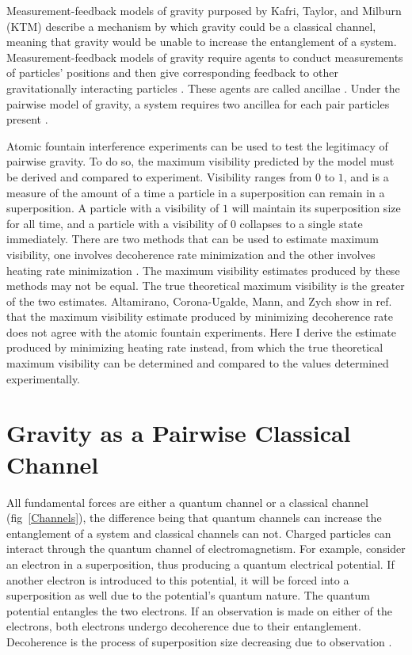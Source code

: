 \documentclass[aps, prd, superscriptaddress,twocolumn,amsmath,amssymb,nofootinbib]{revtex4-1}
\begin{document}
Measurement-feedback models of gravity purposed by Kafri, Taylor, and Milburn (KTM) \cite{KTM1, KTM2, KTM3} describe a mechanism by which gravity could be a classical channel, meaning that gravity would be unable to increase the entanglement of a system. Measurement-feedback models of gravity require agents to conduct measurements of particles' positions and then give corresponding feedback to other gravitationally interacting particles \cite{P6}. These agents are called ancillae \cite{P2}. Under the pairwise model of gravity, a system requires two ancillea for each pair particles present \cite{P3}.

Atomic fountain interference experiments \cite{kovachy, sugarbaker} can be used to test the legitimacy of pairwise gravity. To do so, the maximum visibility predicted by the model must be derived and compared to experiment. Visibility ranges from $0$ to $1$, and is a measure of the amount of a time a particle in a superposition can remain in a superposition. A particle with a visibility of $1$ will maintain its superposition size for all time, and a particle with a visibility of $0$ collapses to a single state immediately. There are two methods that can be used to estimate maximum visibility, one involves decoherence rate minimization and the other involves heating rate minimization \cite{P3}. The maximum visibility estimates produced by these methods may not be equal. The true theoretical maximum visibility is the greater of the two estimates. Altamirano, Corona-Ugalde, Mann, and Zych show in ref.~\cite{P3} that the maximum visibility estimate produced by minimizing decoherence rate does not agree with the atomic fountain experiments. Here I derive the estimate produced by minimizing heating rate instead, from which the true theoretical maximum visibility can be determined and compared to the values determined experimentally.


\section{Gravity as a Pairwise Classical Channel}

All fundamental forces are either a quantum channel or a classical channel (fig~\ref{Channels}), the difference being that quantum channels can increase the entanglement of a system and classical channels can not. Charged particles can interact through the quantum channel of electromagnetism. For example, consider an electron in a superposition, thus producing a quantum electrical potential. If another electron is introduced to this potential, it will be forced into a superposition as well due to the potential's quantum nature. The quantum potential entangles the two electrons. If an observation is made on either of the electrons, both electrons undergo decoherence due to their entanglement. Decoherence is the process of superposition size decreasing due to observation \cite{P6}.
\end{document}
